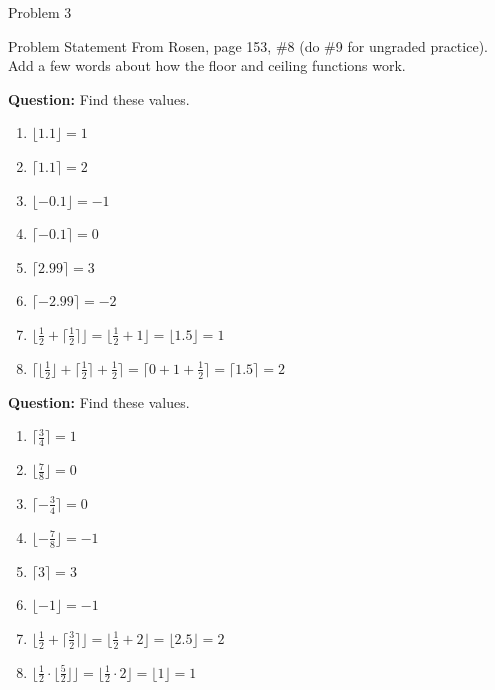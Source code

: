 \begin{problem}{Problem 3}
    \begin{statement}{Problem Statement}
        From Rosen, page 153, \#8 (do \#9 for ungraded practice). Add a few words about how the floor and ceiling functions work.
    \end{statement}

    \begin{Highlight}[Solution - \#8]
        \noindent \textbf{Question:} Find these values.

        \begin{enumerate}[label=(\alph*)]
            \item $\lfloor 1.1 \rfloor = 1$
            \item $\lceil 1.1 \rceil = 2$
            \item $\lfloor -0.1 \rfloor = -1$
            \item $\lceil -0.1 \rceil = 0$
            \item $\lceil 2.99 \rceil = 3$
            \item $\lceil -2.99 \rceil = -2$
            \item $\lfloor \frac{1}{2} + \lceil \frac{1}{2} \rceil \rfloor = \lfloor \frac{1}{2} + 1 \rfloor = \lfloor 1.5 \rfloor = 1$
            \item $\lceil \lfloor \frac{1}{2} \rfloor + \lceil \frac{1}{2} \rceil + \frac{1}{2} \rceil = \lceil 0 + 1 + \frac{1}{2} \rceil = \lceil 1.5 \rceil = 2$
        \end{enumerate}
    \end{Highlight}

    \begin{Highlight}[Solution - \#9]
        \noindent \textbf{Question:} Find these values.

        \begin{enumerate}[label=(\alph*)]
            \item $\lceil \frac{3}{4} \rceil = 1$
            \item $\lfloor \frac{7}{8} \rfloor = 0$
            \item $\lceil -\frac{3}{4} \rceil = 0$
            \item $\lfloor -\frac{7}{8} \rfloor = -1$
            \item $\lceil 3 \rceil = 3$
            \item $\lfloor -1 \rfloor = -1$
            \item $\lfloor \frac{1}{2} + \lceil \frac{3}{2} \rceil \rfloor = \lfloor \frac{1}{2} + 2 \rfloor = \lfloor 2.5 \rfloor = 2$
            \item $\lfloor \frac{1}{2} \cdot \lfloor \frac{5}{2} \rfloor \rfloor = \lfloor \frac{1}{2} \cdot 2 \rfloor = \lfloor 1 \rfloor = 1$
        \end{enumerate}
    \end{Highlight}


\end{problem}
